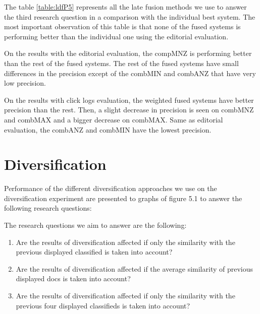 The table \ref{table:ldfP5} represents all the late fusion methods we use to answer the third research question in a comparison with the individual best system. The most important observation of this table is that none of the fused systems is performing better than the individual one using the editorial evaluation.

On the results with the editorial evaluation, the compMNZ is performing better than the rest of the fused systems. The rest of the fused systems have small differences in the precision except of the combMIN and combANZ that have very low precision.

On the results with click logs evaluation, the weighted fused systems have better precision than the rest. Then, a slight decrease in precision is seen on combMNZ and combMAX and a bigger decrease on combMAX. Same as editorial evaluation, the combANZ and combMIN have the lowest precision.


\section{Diversification}

Performance of the different diversification approaches we use on the diversification experiment are presented to graphs of figure 5.1 to answer the following research questions:

The research questions we aim to answer are the following:
\begin{enumerate}
\item Are the results of diversification affected if only the similarity with the previous displayed classified is taken into account?
\item Are the results of diversification affected if the average similarity of previous displayed docs is taken into account?
\item Are the results of diversification affected if only the similarity with the previous four displayed classifieds is taken into account?
\end{enumerate}

